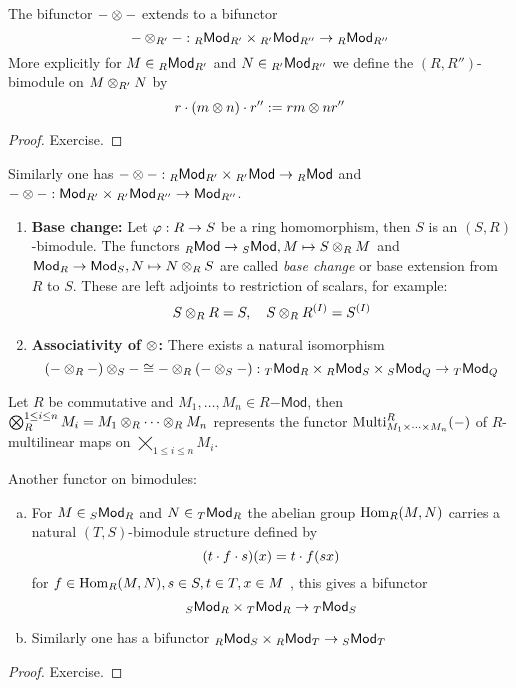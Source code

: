 \documentclass[a4paper]{report}
\begin{document}
\begin{prop}
  The bifunctor $-\otimes-$ extends to a bifunctor \[- \otimes_{R'} - : {}_R\mathsf{Mod}_{R'} \times {}_{R'}\mathsf{Mod}_{R''} \to {}_R\mathsf{Mod}_{R''}\]
  More explicitly for $M \in {}_R\mathsf{Mod}_{R'}$ and $N \in {}_{R'}\mathsf{Mod}_{R''}$ we define the $(R,R'')$-bimodule on $M \otimes_{R'} N$ by \[r \cdot (m \otimes n) \cdot r'' := rm \otimes nr''\]
\begin{proof}
Exercise.
\end{proof}
\end{prop}
\begin{rem*}
Similarly one has $- \otimes - : {}_R\mathsf{Mod}_{R'} \times {}_{R'}\mathsf{Mod} \to {}_R\mathsf{Mod}$ and $- \otimes - : \mathsf{Mod}_{R'} \times {}_{R'}\mathsf{Mod}_{R''} \to \mathsf{Mod}_{R''}$.
\end{rem*}
\begin{exmps*}\item
  \begin{enumerate}
    \item \textbf{Base change:} Let $\varphi: R \to S$ be a ring homomorphism, then $S$ is an $(S, R)$-bimodule. The functors ${}_R\mathsf{Mod} \to {}_{S}\mathsf{Mod}, M \mapsto S \otimes_{R} M$ and $\mathsf{Mod}_R \to \mathsf{Mod}_{S}, N \mapsto N \otimes_{R} S$ are called \emph{base change} or base extension from $R$ to $S$. These are left adjoints to restriction of scalars, for example: \[S \otimes_{R} R = S, \quad S \otimes_{R}R^{(I)} = S^{(I)}\]
    \item \textbf{Associativity of $\otimes$:} There exists a natural isomorphism
          \[(- \otimes_{R} -) \otimes_{S} - \cong - \otimes_{R} (- \otimes_{S} - ) : {}_{T}\mathsf{Mod}_{R} \times {}_R\mathsf{Mod}_{S} \times {}_{S}\mathsf{Mod}_{Q} \to {}_{T}\mathsf{Mod}_{Q}\]
  \end{enumerate}
\end{exmps*}
\begin{rem*}
Let $R$ be commutative and $M_{1}, \ldots, M_{n} \in R\mathsf{-Mod}$, then $\bigotimes_{R}^{1 \le i \le n} M_{i} = M_{1} \otimes_{R} \cdots \otimes_{R} M_{n}$ represents the functor $\operatorname{Multi}_{M_{1} \times \cdots \times M_{n}}^{R}(-)$ of $R$-multilinear maps on $\bigtimes_{1 \le i \le n}M_{i}$.
\end{rem*}

\begin{prop}
  Another functor on bimodules:
  \begin{enumerate}[(a)]
    \item For $M \in {}_{S}\mathsf{Mod}_R$ and $N \in {}_{T}\mathsf{Mod}_R$ the abelian group $\operatorname{Hom}_{R}(M,N)$ carries a natural $(T,S)$-bimodule structure defined by \[(t \cdot f \cdot s)(x) = t \cdot f(sx)\]
          for $f \in \operatorname{Hom}_{R}(M,N), s \in S, t \in T, x \in M$ , this gives a bifunctor \[{}_{S}\mathsf{Mod}_R \times {}_{T}\mathsf{Mod}_R \to {}_{T}\mathsf{Mod}_{S}\]
          \item Similarly one has a bifunctor ${}_R\mathsf{Mod}_{S} \times {}_R\mathsf{Mod}_{T} \to {}_{S}\mathsf{Mod}_{T}$
  \end{enumerate}
\begin{proof}
Exercise.
\end{proof}
\end{prop}
\end{document}
